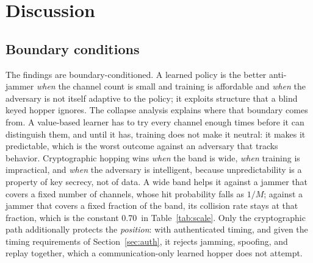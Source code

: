 \documentclass[journal]{IEEEtran}
\newcommand{\cryptoScale}{0.70}
\begin{document}
\section{Discussion}\label{sec:discussion}
\subsection{Boundary conditions}
The findings are boundary-conditioned. A learned policy is the better
anti-jammer \emph{when} the channel count is small and training is affordable
and \emph{when} the adversary is not itself adaptive to the policy; it exploits
structure that a blind keyed hopper ignores. The collapse analysis explains
where that boundary comes from. A value-based learner has to try every channel
enough times before it can distinguish them, and until it has, training does
not make it neutral: it makes it predictable, which is the worst outcome
against an adversary that tracks behavior. Cryptographic hopping wins
\emph{when} the band is wide, \emph{when} training is impractical, and
\emph{when} the adversary is intelligent, because unpredictability is a
property of key secrecy, not of data. A wide band helps it against a jammer
that covers a fixed number of channels, whose hit probability falls as $1/M$;
against a jammer that covers a fixed fraction of the band, its collision rate
stays at that fraction, which is the constant \cryptoScale\ in
Table~\ref{tab:scale}. Only the cryptographic path additionally protects the
\emph{position}: with authenticated timing, and given the timing requirements
of Section~\ref{sec:auth}, it rejects jamming, spoofing, and replay together,
which a communication-only learned hopper does not attempt.
\end{document}

